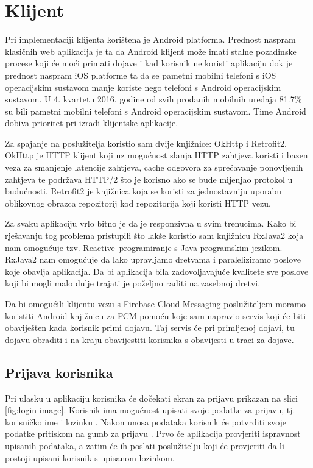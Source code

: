 \documentclass[times, utf8, zavrsni]{fer}
\begin{document}
{\section{Klijent}
Pri implementaciji klijenta korištena je Android platforma. Prednost naspram klasičnih web aplikacija je ta da Android klijent može imati stalne pozadinske procese koji će moći primati dojave i kad korisnik ne koristi aplikaciju dok je prednost naspram iOS platforme ta da se pametni mobilni telefoni s iOS operacijskim sustavom manje koriste nego telefoni s Android operacijskim sustavom. U 4. kvartetu 2016. godine od svih prodanih mobilnih uređaja 81.7\% \citep{vincent2017} su bili pametni mobilni telefoni s Android operacijskim sustavom. Time Android dobiva prioritet pri izradi klijentske aplikacije.

Za spajanje na poslužitelja koristio sam dvije knjižnice: OkHttp i Retrofit2. OkHttp je HTTP klijent koji uz mogućnost slanja HTTP zahtjeva koristi i bazen veza za smanjenje latencije zahtjeva, cache odgovora za sprečavanje ponovljenih zahtjeva te podržava HTTP/2 što je korisno ako se bude mijenjao protokol u budućnosti. Retrofit2 je knjižnica koja se koristi za jednostavniju uporabu oblikovnog obrazca repozitorij kod repozitorija koji koristi HTTP vezu.

Za svaku aplikaciju vrlo bitno je da je responzivna u svim trenucima. Kako bi rješavanju tog problema pristupili što lakše koristio sam knjižnicu RxJava2 koja nam omogućuje tzv. \glqq Reactive\grqq\  programiranje s Java programskim jezikom. RxJava2 nam omogućuje da lako upravljamo dretvama i paraleliziramo poslove koje obavlja aplikacija. Da bi aplikacija bila zadovoljavajuće kvalitete sve poslove koji bi mogli malo dulje trajati je poželjno raditi na zasebnoj dretvi.

Da bi omogućili klijentu vezu s Firebase Cloud Messaging poslužiteljem moramo koristiti Android knjižnicu za FCM pomoću koje sam napravio servis koji će biti obaviješten kada korisnik primi dojavu. Taj servis će pri primljenoj dojavi, tu dojavu obraditi i na kraju obavijestiti korisnika s obavijesti u traci za dojave.

\subsection{Prijava korisnika}
Pri ulasku u aplikaciju korisnika će dočekati ekran za prijavu prikazan na slici \ref{fig:login-image}. Korisnik ima mogućnost upisati svoje podatke za prijavu, tj. korisničko ime  i lozinku . Nakon unosa podataka korisnik će potvrditi svoje podatke pritiskom na gumb za prijavu . Prvo će aplikacija provjeriti ispravnost upisanih podataka, a zatim će ih poslati poslužitelju koji će provjeriti da li postoji upisani korisnik s upisanom lozinkom.

}
\end{document}
